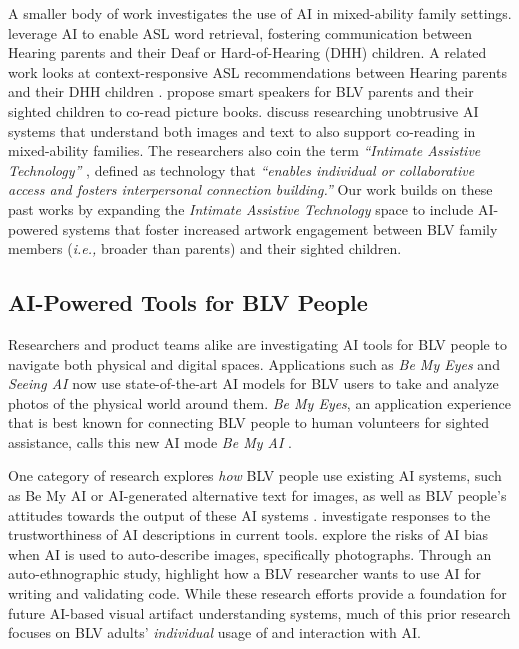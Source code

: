 \documentclass[sigconf]{acmart}
\begin{document}
A smaller body of work investigates the use of AI in mixed-ability family settings. \citet{ASL_DeafChild_HearingParent} leverage AI to enable ASL word retrieval, fostering communication between Hearing parents and their Deaf or Hard-of-Hearing (DHH) children. A related work looks at context-responsive ASL recommendations between Hearing parents and their DHH children \cite{Hossain_ContextResponsiveASL}. \citet{Park_AllAboutPictures_2023} propose smart speakers for BLV parents and their sighted children to co-read picture books. \citet{cuddlingup} discuss researching unobtrusive AI systems that understand both images and text to also support co-reading in mixed-ability families. The researchers also coin the term \textit{``Intimate Assistive Technology''} \cite{cuddlingup}, defined as technology that \textit{``enables individual or collaborative access and fosters interpersonal connection building.''} Our work builds on these past works by expanding the \textit{Intimate Assistive Technology} space to include AI-powered systems that foster increased artwork engagement between BLV family members (\textit{i.e.,} broader than parents) and their sighted children.

\subsection{AI-Powered Tools for BLV People}
Researchers and product teams alike are investigating AI tools for BLV people to navigate both physical and digital spaces. Applications such as \textit{Be My Eyes} \cite{be_my_eyes_2024} and \textit{Seeing AI} now use state-of-the-art AI models for BLV users to take and analyze photos of the physical world around them. \textit{Be My Eyes}, an application experience that is best known for connecting BLV people to human volunteers for sighted assistance, calls this new AI mode \textit{Be My AI} \cite{be_my_ai_2024}.  

One category of research explores \textit{how} BLV people use existing AI systems, such as Be My AI or AI-generated alternative text for images, as well as BLV people's attitudes towards the output of these AI systems \cite{gonzalez_CHI, Das_ProvenanceToAberrations, bennett_itscomplicated, Glazko_Autoethnography}. \citet{gonzalez_CHI} investigate responses to the trustworthiness of AI descriptions in current tools. \citet{bennett_itscomplicated} explore the risks of AI bias when AI is used to auto-describe images, specifically photographs. Through an auto-ethnographic study, \citet{Glazko_Autoethnography} highlight how a BLV researcher wants to use AI for writing and validating code. While these research efforts provide a foundation for future AI-based visual artifact understanding systems, much of this prior research focuses on BLV adults' \textit{individual} usage of and interaction with AI.
\end{document}
